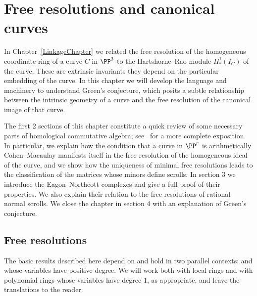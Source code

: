 

\chapter{Free resolutions and canonical curves}
\label{SyzygiesChapter}

\def\length{\mathrm{ length}}

In Chapter~\ref{LinkageChapter} we related the free resolution of the homogeneous
coordinate ring of a curve $C$
in $\PP^3$ to the Hartshorne--Rao module $H^{1}_{*}(I_{C})$ of the curve. These 
are extrinsic invariants \emdash they depend on the particular embedding of the curve.
 In this chapter we will develop the
language and machinery to understand Green's conjecture, which posits a
subtle relationship between the intrinsic geometry of a curve and the free resolution
of the canonical image of that curve.

The first 2 sections of this
chapter constitute a quick review of some necessary parts of
 homological commutative algebra; see~\cite[Part III]{Eisenbud1995}
 for a more complete exposition. In particular, we
  explain how the condition that a curve
in $\PP^r$ is arithmetically Cohen--Macaulay manifests itself in the
free resolution of the homogeneous ideal of the curve, and we show
how the uniqueness of minimal free resolutions leads to the
classification of the matrices whose minors define 
scrolls. In section 3 we
introduce the Eagon--Northcott complexes and give a full proof of their
properties. We also explain their relation to
the free resolutions of rational normal scrolls. We close the chapter in section 4 with an
explanation of Green's conjecture.

\section{Free resolutions}

The basic results described here depend on 
 and hold 
%
 in two parallel contexts:
%
%
and
%
%
whose variables have positive degree. 
We will work both with local rings and with
polynomial rings whose variables have degree 1,
as appropriate, and leave the translations to the reader.



